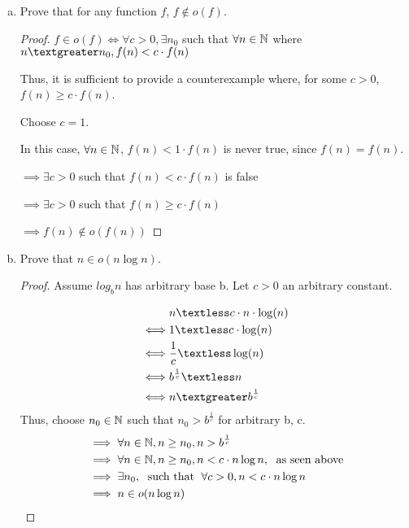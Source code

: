 \documentclass[11pt]{article}
\begin{document}
\begin{enumerate}[(a)]

\item Prove that for any function $f$, $f \notin o(f)$.

\begin{proof}

$f \in o(f) \iff \forall c > 0,  \exists n_{0}$ such that $\forall n \in \mathbb{N}$ where $n \textgreater n_{0}, f(n) < c \cdot f(n)$ 

Thus, it is sufficient to provide a counterexample where, for some $c > 0$, $f(n) \geq c \cdot f(n)$.

Choose $c = 1$.

In this case, $\forall n \in \mathbb{N}$, $f(n) < 1 \cdot f(n)$ is never true, since $f(n) = f(n)$.

$\implies \exists c > 0$ such that $f(n) < c \cdot f(n)$ is false

$\implies \exists c > 0$ such that $f(n) \geq c \cdot f(n)$

$\implies f(n) \notin o(f(n))$

\end{proof}

\item Prove that $n \in o(n \log n)$.

\begin{proof}
Assume $log_{b} n$ has arbitrary base b. Let $c > 0$ an arbitrary constant.

\begin{align*}
&n \textless c \cdot n \cdot \log(n) \\
\iff& 1 \textless c \cdot \log(n)\\
\iff& \frac{1}{c} \textless \log(n)\\
\iff& b^{\frac{1}{c}} \textless n\\
\iff& n \textgreater b^{\frac{1}{c}}\\
\end{align*}
Thus, choose $n_{0} \in \mathbb{N}$ such that $n_{0} > b^{\frac{1}{c}}$ for arbitrary b, c.
\begin{align*}
&\implies \forall n \in \mathbb{N}, n \geq n_{0}, n > b^{\frac{1}{c}}\\
&\implies \forall n \in \mathbb{N}, n \geq n_{0}, n < c \cdot n \log n, \text{\; as seen above}\\
&\implies \exists n_{0}, \text {\; such that \;} \forall c > 0, n < c \cdot n \log n\\
&\implies n \in o(n \log n)\\
\end{align*}

\end{proof}

\end{enumerate}
\end{document}
